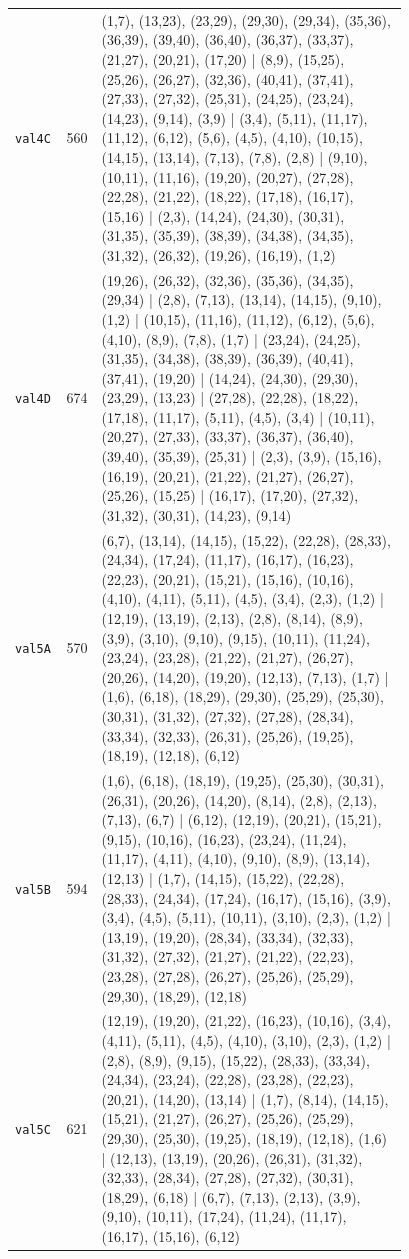 \begin{landscape}
\begin{longtable}{lr>{\tiny\raggedright\arraybackslash}p{0.78\linewidth}}
\texttt{val4C} & 560 & (1,7), (13,23), (23,29), (29,30), (29,34), (35,36), (36,39), (39,40), (36,40), (36,37), (33,37), (21,27), (20,21), (17,20) | (8,9), (15,25), (25,26), (26,27), (32,36), (40,41), (37,41), (27,33), (27,32), (25,31), (24,25), (23,24), (14,23), (9,14), (3,9) | (3,4), (5,11), (11,17), (11,12), (6,12), (5,6), (4,5), (4,10), (10,15), (14,15), (13,14), (7,13), (7,8), (2,8) | (9,10), (10,11), (11,16), (19,20), (20,27), (27,28), (22,28), (21,22), (18,22), (17,18), (16,17), (15,16) | (2,3), (14,24), (24,30), (30,31), (31,35), (35,39), (38,39), (34,38), (34,35), (31,32), (26,32), (19,26), (16,19), (1,2) \\[2pt]
\texttt{val4D} & 674 & (19,26), (26,32), (32,36), (35,36), (34,35), (29,34) | (2,8), (7,13), (13,14), (14,15), (9,10), (1,2) | (10,15), (11,16), (11,12), (6,12), (5,6), (4,10), (8,9), (7,8), (1,7) | (23,24), (24,25), (31,35), (34,38), (38,39), (36,39), (40,41), (37,41), (19,20) | (14,24), (24,30), (29,30), (23,29), (13,23) | (27,28), (22,28), (18,22), (17,18), (11,17), (5,11), (4,5), (3,4) | (10,11), (20,27), (27,33), (33,37), (36,37), (36,40), (39,40), (35,39), (25,31) | (2,3), (3,9), (15,16), (16,19), (20,21), (21,22), (21,27), (26,27), (25,26), (15,25) | (16,17), (17,20), (27,32), (31,32), (30,31), (14,23), (9,14) \\[2pt]
\texttt{val5A} & 570 & (6,7), (13,14), (14,15), (15,22), (22,28), (28,33), (24,34), (17,24), (11,17), (16,17), (16,23), (22,23), (20,21), (15,21), (15,16), (10,16), (4,10), (4,11), (5,11), (4,5), (3,4), (2,3), (1,2) | (12,19), (13,19), (2,13), (2,8), (8,14), (8,9), (3,9), (3,10), (9,10), (9,15), (10,11), (11,24), (23,24), (23,28), (21,22), (21,27), (26,27), (20,26), (14,20), (19,20), (12,13), (7,13), (1,7) | (1,6), (6,18), (18,29), (29,30), (25,29), (25,30), (30,31), (31,32), (27,32), (27,28), (28,34), (33,34), (32,33), (26,31), (25,26), (19,25), (18,19), (12,18), (6,12) \\[2pt]
\texttt{val5B} & 594 & (1,6), (6,18), (18,19), (19,25), (25,30), (30,31), (26,31), (20,26), (14,20), (8,14), (2,8), (2,13), (7,13), (6,7) | (6,12), (12,19), (20,21), (15,21), (9,15), (10,16), (16,23), (23,24), (11,24), (11,17), (4,11), (4,10), (9,10), (8,9), (13,14), (12,13) | (1,7), (14,15), (15,22), (22,28), (28,33), (24,34), (17,24), (16,17), (15,16), (3,9), (3,4), (4,5), (5,11), (10,11), (3,10), (2,3), (1,2) | (13,19), (19,20), (28,34), (33,34), (32,33), (31,32), (27,32), (21,27), (21,22), (22,23), (23,28), (27,28), (26,27), (25,26), (25,29), (29,30), (18,29), (12,18) \\[2pt]
\texttt{val5C} & 621 & (12,19), (19,20), (21,22), (16,23), (10,16), (3,4), (4,11), (5,11), (4,5), (4,10), (3,10), (2,3), (1,2) | (2,8), (8,9), (9,15), (15,22), (28,33), (33,34), (24,34), (23,24), (22,28), (23,28), (22,23), (20,21), (14,20), (13,14) | (1,7), (8,14), (14,15), (15,21), (21,27), (26,27), (25,26), (25,29), (29,30), (25,30), (19,25), (18,19), (12,18), (1,6) | (12,13), (13,19), (20,26), (26,31), (31,32), (32,33), (28,34), (27,28), (27,32), (30,31), (18,29), (6,18) | (6,7), (7,13), (2,13), (3,9), (9,10), (10,11), (17,24), (11,24), (11,17), (16,17), (15,16), (6,12) \\[2pt]

\end{longtable}
\end{landscape}
